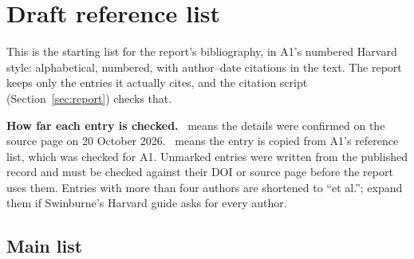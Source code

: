 \section{Draft reference list}
\label{app:refs}

This is the starting list for the report's bibliography, in A1's numbered Harvard style:
alphabetical, numbered, with author--date citations in the text. The report keeps only the
entries it actually cites, and the citation script (Section~\ref{sec:report}) checks that.

\textbf{How far each entry is checked.}
\textdagger\ means the details were confirmed on the source page on 20 October 2026.
\textdaggerdbl\ means the entry is copied from A1's reference list, which was checked for A1.
Unmarked entries were written from the published record and must be checked against their DOI
or source page before the report uses them. Entries with more than four authors are shortened
to ``et al.''; expand them if Swinburne's Harvard guide asks for every author.

\subsection*{Main list}

